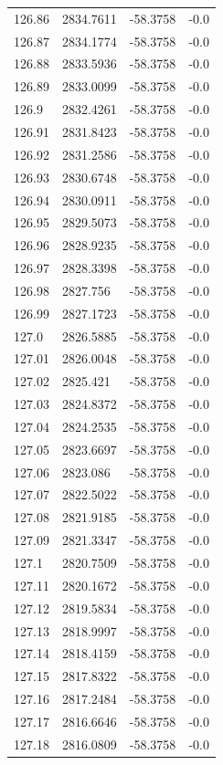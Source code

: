 \begin{table}[H]
\begin{tabular}{llll}
126.86 & 2834.7611 & -58.3758 & -0.0 \\
126.87 & 2834.1774 & -58.3758 & -0.0 \\
126.88 & 2833.5936 & -58.3758 & -0.0 \\
126.89 & 2833.0099 & -58.3758 & -0.0 \\
126.9 & 2832.4261 & -58.3758 & -0.0 \\
126.91 & 2831.8423 & -58.3758 & -0.0 \\
126.92 & 2831.2586 & -58.3758 & -0.0 \\
126.93 & 2830.6748 & -58.3758 & -0.0 \\
126.94 & 2830.0911 & -58.3758 & -0.0 \\
126.95 & 2829.5073 & -58.3758 & -0.0 \\
126.96 & 2828.9235 & -58.3758 & -0.0 \\
126.97 & 2828.3398 & -58.3758 & -0.0 \\
126.98 & 2827.756 & -58.3758 & -0.0 \\
126.99 & 2827.1723 & -58.3758 & -0.0 \\
127.0 & 2826.5885 & -58.3758 & -0.0 \\
127.01 & 2826.0048 & -58.3758 & -0.0 \\
127.02 & 2825.421 & -58.3758 & -0.0 \\
127.03 & 2824.8372 & -58.3758 & -0.0 \\
127.04 & 2824.2535 & -58.3758 & -0.0 \\
127.05 & 2823.6697 & -58.3758 & -0.0 \\
127.06 & 2823.086 & -58.3758 & -0.0 \\
127.07 & 2822.5022 & -58.3758 & -0.0 \\
127.08 & 2821.9185 & -58.3758 & -0.0 \\
127.09 & 2821.3347 & -58.3758 & -0.0 \\
127.1 & 2820.7509 & -58.3758 & -0.0 \\
127.11 & 2820.1672 & -58.3758 & -0.0 \\
127.12 & 2819.5834 & -58.3758 & -0.0 \\
127.13 & 2818.9997 & -58.3758 & -0.0 \\
127.14 & 2818.4159 & -58.3758 & -0.0 \\
127.15 & 2817.8322 & -58.3758 & -0.0 \\
127.16 & 2817.2484 & -58.3758 & -0.0 \\
127.17 & 2816.6646 & -58.3758 & -0.0 \\
127.18 & 2816.0809 & -58.3758 & -0.0 \\

\end{tabular}
\end{table}
